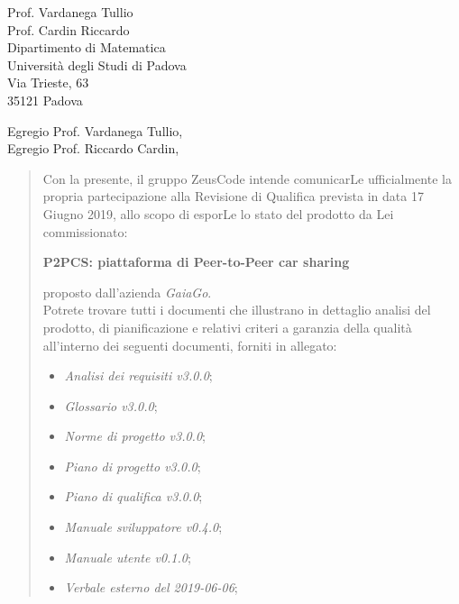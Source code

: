 \begin{letter}{
		Prof. Vardanega Tullio \\
		Prof. Cardin Riccardo \\
		Dipartimento di Matematica \\
		Università degli Studi di Padova \\
		Via Trieste, 63 \\
		35121 Padova}
		
\opening{Egregio Prof. Vardanega Tullio,\\Egregio Prof. Riccardo Cardin,}

\begin{quotation}
Con la presente, il gruppo ZeusCode intende comunicarLe ufficialmente la propria partecipazione alla Revisione di Qualifica prevista in data 17 Giugno 2019, allo scopo di esporLe lo stato del prodotto
da Lei commissionato:

\begin{center}
	\textbf{P2PCS: piattaforma di Peer-to-Peer car sharing}
\end{center}

\noindent proposto dall'azienda \textit{GaiaGo}.\\
Potrete trovare tutti i documenti che illustrano in dettaglio analisi del prodotto, di pianificazione e relativi criteri a garanzia della qualità all'interno dei seguenti 
documenti, forniti in allegato:

\bigskip

\begin{itemize}
	\item \textit{Analisi dei requisiti v3.0.0};
	
	\item \textit{Glossario v3.0.0};
	
	\item \textit{Norme di progetto v3.0.0};

	\item \textit{Piano di progetto v3.0.0};

	\item \textit{Piano di qualifica v3.0.0};
	
	\item \textit{Manuale sviluppatore v0.4.0};
	
	\item \textit{Manuale utente v0.1.0};


	\item \textit{Verbale esterno del 2019-06-06};
	

\end{itemize}
\end{quotation}
\end{letter}
